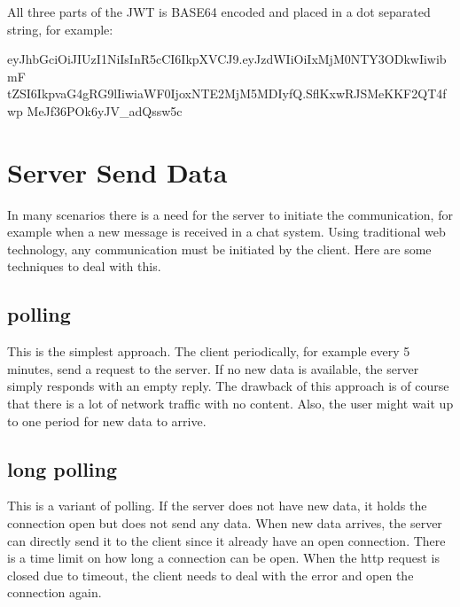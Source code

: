 All three parts of the JWT is BASE64 encoded and placed in a dot separated string, for example:
\begin{Code}
eyJhbGciOiJIUzI1NiIsInR5cCI6IkpXVCJ9.eyJzdWIiOiIxMjM0NTY3ODkwIiwibmF
tZSI6IkpvaG4gRG9lIiwiaWF0IjoxNTE2MjM5MDIyfQ.SflKxwRJSMeKKF2QT4fwp
MeJf36POk6yJV_adQssw5c
\end{Code}

\chapter{Server Send Data} \label{chapter:server:push}
In many scenarios there is a need for the server to initiate  the communication, for example when a new message is received in a chat system. Using traditional web technology, any communication must be initiated by the client. Here are some techniques to deal with this.
\section{polling}
This is the simplest approach. The client periodically, for example every 5 minutes, send a request to the server. If no new data is available, the server simply responds with an empty reply. The drawback of this approach is of course that there is a lot of network traffic with no content. Also, the user might wait up to one period for new data to arrive.
\section{long polling}
This is a variant of polling. If the server does not have new data, it holds the connection open but does not send any data. When new data arrives, the server can directly send it to the client since it already have an open connection. There is a time limit on how long a connection can be open. When the http request is closed due to timeout, the client needs to deal with the error and open the connection again.
